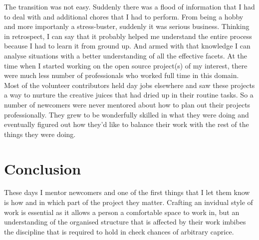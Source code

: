The transition was not easy. Suddenly there was a flood of information that I had to deal with and additional chores that I had to perform. From being a hobby and more importanly a stress-buster, suddenly it was serious business. Thinking in retrospect, I can say that it probably helped me understand the entire process because I had to learn it from ground up. And armed with that knowledge I can analyse situations with a better understanding of all the effective facets. At the time when I started working on the open source project(s) of my interest, there were much less number of professionals who worked full time in this domain. Most of the volunteer contributors held day jobs elsewhere and saw these projects a way to nurture the creative juices that had dried up in their routine tasks. So a number of newcomers were never mentored about how to plan out their projects professionally. They grew to be wonderfully skilled in what they were doing and eventually figured out how they'd like to balance their work with the rest of the things they were doing.

\section*{Conclusion}

These days I mentor newcomers and one of the first things that I let them know is how and in which part of the project they matter. Crafting an invidual style of work is essential as it allows a person a comfortable space to work in, but an understanding of the organised structure that is affected by their work imbibes the discipline that is required to hold in check chances of arbitrary caprice.
